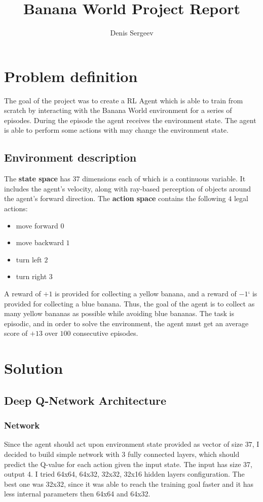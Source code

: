 \documentclass{report}
\begin{document}
\title{Banana World Project Report}
\author{Denis Sergeev}


\section*{Problem definition}

The goal of the project was to create a RL Agent which is able to train from scratch by interacting with the Banana World environment for a series of episodes. During the episode the agent receives the environment state. The agent is able to perform some actions with may change the environment state.

\subsection*{Environment description}
The \textbf{state space} has \(37\) dimensions each of which is a continuous variable. It includes the agent's velocity, along with ray-based perception of objects around the agent's forward direction. The \textbf{action space} contains the following \(4\) legal actions:
\begin{itemize}
  \item move forward \(0\)
  \item move backward \(1\)
  \item turn left \(2\)
  \item turn right \(3\)
\end{itemize}
A reward of \(+1\) is provided for collecting a yellow banana, and a reward of \(-1\)` is provided for collecting a blue banana. Thus, the goal of the agent is to collect as many yellow bananas as possible while avoiding blue bananas. The task is episodic, and in order to solve the environment, the agent must get an average score of \(+13\) over \(100\) consecutive episodes.


\section*{Solution}
\subsection*{Deep Q-Network Architecture}
\subsubsection*{Network}
Since the agent should act upon environment state provided as vector of size \(37\), I decided to build simple network with \(3\) fully connected layers, which should predict the Q-value for each action given the input state. The input has size 37, output 4. I tried 64x64, 64x32, 32x32, 32x16 hidden layers configuration. The best one was 32x32, since it was able to reach the training goal faster and it has less internal parameters then 64x64 and 64x32.
\end{document}
